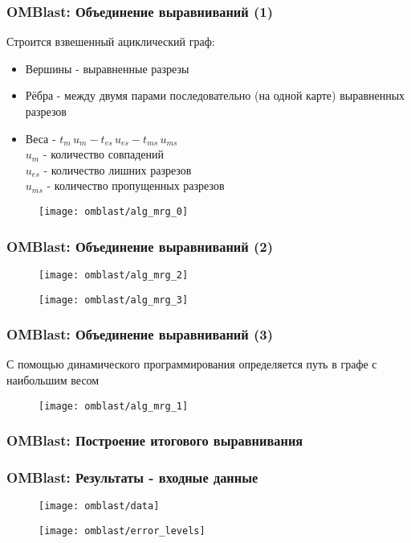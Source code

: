 \begin{frame}
\frametitle{OMBlast: Объединение выравниваний (1)}
  Строится взвешенный ациклический граф:
  \begin{itemize}
    \item Вершины - выравненные разрезы
    \item Рёбра - между двумя парами последовательно (на одной карте) выравненных разрезов
    \item Веса - $t_m \, u_m - t_{es} \, u_{es} - t_{ms} \, u_{ms}$ \\
    $u_{m}$ - количество совпадений\\
    $u_{es}$ - количество лишних разрезов\\
    $u_{ms}$ - количество пропущенных разрезов
  \end{itemize}
  \begin{figure}
    \centering
    \texttt{[image: omblast/alg\_mrg\_0]}
  \end{figure}
\end{frame}

\begin{frame}
\frametitle{OMBlast: Объединение выравниваний (2)}
  \begin{figure}
    \centering
    \texttt{[image: omblast/alg\_mrg\_2]}
  \end{figure}
  \begin{figure}
    \centering
    \texttt{[image: omblast/alg\_mrg\_3]}
  \end{figure}

\end{frame}

\begin{frame}
\frametitle{OMBlast: Объединение выравниваний (3)}
С помощью динамического программирования определяется путь в графе с наибольшим весом
  \begin{figure}
    \centering
    \texttt{[image: omblast/alg\_mrg\_1]}
  \end{figure}

\end{frame}


\begin{frame}
\frametitle{OMBlast: Построение итогового выравнивания}


\end{frame}

\begin{frame}
\frametitle{OMBlast: Результаты - входные данные}
  \begin{figure}
    \centering
    \texttt{[image: omblast/data]}
  \end{figure}
  \begin{figure}
    \centering
    \texttt{[image: omblast/error\_levels]}
  \end{figure}
\end{frame}

